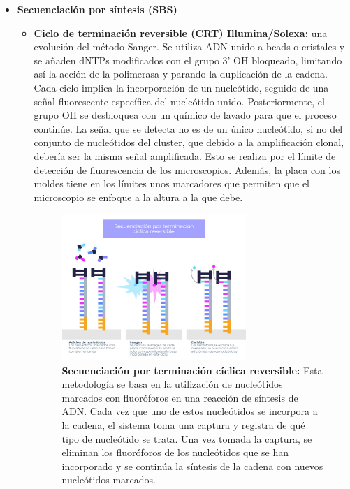 \begin{itemize}
\item \textbf{Secuenciación por síntesis (SBS)}
\begin{itemize}
\item \textbf{Ciclo de terminación reversible (CRT) Illumina/Solexa:} una evolución del método Sanger. Se utiliza ADN unido a beads o cristales y se añaden dNTPs modificados con el grupo 3’ OH bloqueado, limitando así la acción de la polimerasa y parando la duplicación de la cadena. Cada ciclo implica la incorporación de un nucleótido, seguido de una señal fluorescente específica del nucleótido unido. Posteriormente, el grupo OH se desbloquea con un químico de lavado para que el proceso continúe. La señal que se detecta no es de un único nucleótido, si no del conjunto de nucleótidos del cluster, que debido a la amplificación clonal, debería ser la misma señal amplificada. Esto se realiza por el límite de detección de fluorescencia de los microscopios. Además, la placa con los moldes tiene en los límites unos marcadores que permiten que el microscopio se enfoque a la altura a la que debe. 

\begin{figure}[htbp]
\centering
\includegraphics[width = 0.7\textwidth]{figs/secuenciacion-terminacion-ciclica-reversible.jpg}
\caption{\textbf{Secuenciación por terminación cíclica reversible:}
Esta metodología se basa en la utilización de nucleótidos marcados con fluoróforos en una reacción de síntesis de ADN. Cada vez que uno de estos nucleótidos se incorpora a la cadena, el sistema toma una captura y registra de qué tipo de nucleótido se trata. Una vez tomada la captura, se eliminan los fluoróforos de los nucleótidos que se han incorporado y se continúa la síntesis de la cadena con nuevos nucleótidos marcados. }
\end{figure}


\end{itemize}
\end{itemize}
